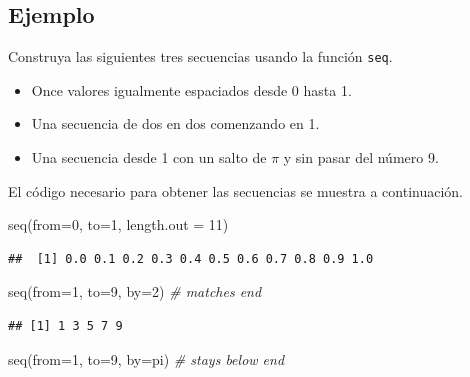\documentclass[
]{book}
\makeatletter
\newenvironment{Shaded}{\begin{snugshade}}{\end{snugshade}}
\newcommand{\AttributeTok}[1]{\textcolor[rgb]{0.77,0.63,0.00}{#1}}
\newcommand{\CommentTok}[1]{\textcolor[rgb]{0.56,0.35,0.01}{\textit{#1}}}
\newcommand{\DecValTok}[1]{\textcolor[rgb]{0.00,0.00,0.81}{#1}}
\newcommand{\FunctionTok}[1]{\textcolor[rgb]{0.00,0.00,0.00}{#1}}
\newcommand{\NormalTok}[1]{#1}
\providecommand{\tightlist}{%
  \setlength{\itemsep}{0pt}\setlength{\parskip}{0pt}}
\newenvironment{kframe}{%
\medskip{}
\setlength{\fboxsep}{.8em}
 \def\at@end@of@kframe{}%
 \ifinner\ifhmode%
  \def\at@end@of@kframe{\end{minipage}}%
  \begin{minipage}{\columnwidth}%
 \fi\fi%
 \def\FrameCommand##1{\hskip\@totalleftmargin \hskip-\fboxsep
 \colorbox{shadecolor}{##1}\hskip-\fboxsep
     \hskip-\linewidth \hskip-\@totalleftmargin \hskip\columnwidth}%
 \MakeFramed {\advance\hsize-\width
   \@totalleftmargin\z@ \linewidth\hsize
   \@setminipage}}%
 {\par\unskip\endMakeFramed%
 \at@end@of@kframe}
\renewenvironment{Shaded}{\begin{kframe}}{\end{kframe}}
\makeatother
\begin{document}
\hypertarget{ejemplo-10}{%
\subsection*{Ejemplo}\label{ejemplo-10}}

Construya las siguientes tres secuencias usando la función \texttt{seq}.

\begin{itemize}
\tightlist
\item
  Once valores igualmente espaciados desde 0 hasta 1.
\item
  Una secuencia de dos en dos comenzando en 1.
\item
  Una secuencia desde 1 con un salto de \(\pi\) y sin pasar del número 9.
\end{itemize}

El código necesario para obtener las secuencias se muestra a continuación.

\begin{Shaded}
\begin{Highlighting}[]
\FunctionTok{seq}\NormalTok{(}\AttributeTok{from=}\DecValTok{0}\NormalTok{, }\AttributeTok{to=}\DecValTok{1}\NormalTok{, }\AttributeTok{length.out =} \DecValTok{11}\NormalTok{)}
\end{Highlighting}
\end{Shaded}

\begin{verbatim}
##  [1] 0.0 0.1 0.2 0.3 0.4 0.5 0.6 0.7 0.8 0.9 1.0
\end{verbatim}

\begin{Shaded}
\begin{Highlighting}[]
\FunctionTok{seq}\NormalTok{(}\AttributeTok{from=}\DecValTok{1}\NormalTok{, }\AttributeTok{to=}\DecValTok{9}\NormalTok{, }\AttributeTok{by=}\DecValTok{2}\NormalTok{)  }\CommentTok{\# matches \textquotesingle{}end\textquotesingle{}}
\end{Highlighting}
\end{Shaded}

\begin{verbatim}
## [1] 1 3 5 7 9
\end{verbatim}

\begin{Shaded}
\begin{Highlighting}[]
\FunctionTok{seq}\NormalTok{(}\AttributeTok{from=}\DecValTok{1}\NormalTok{, }\AttributeTok{to=}\DecValTok{9}\NormalTok{, }\AttributeTok{by=}\NormalTok{pi) }\CommentTok{\# stays below \textquotesingle{}end\textquotesingle{}}
\end{Highlighting}
\end{Shaded}
\end{document}
